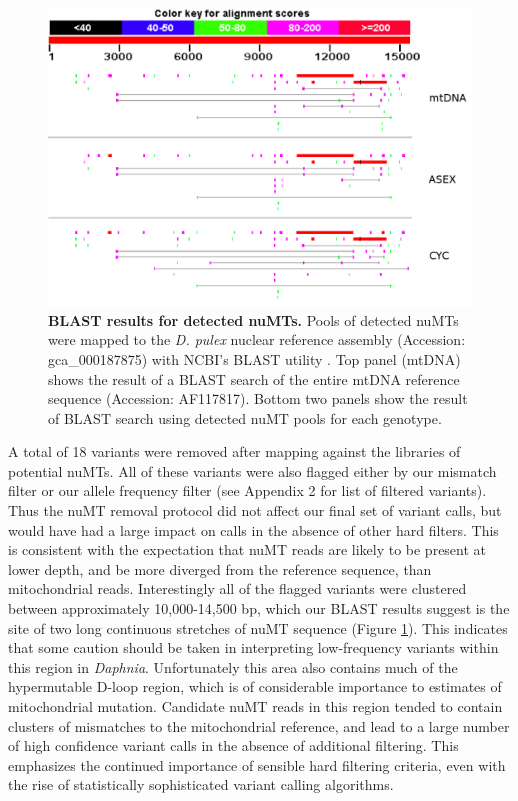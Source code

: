 \documentclass[12pt,twoside]{reedthesis}
\begin{document}
\begin{figure}[h]
    \begin{center}
        \includegraphics[width=1\linewidth]{../figures/numt_blast.jpeg}
    \end{center}
    \caption[BLAST results for detected nuMTs]{\textbf{BLAST results for detected nuMTs.} Pools of detected nuMTs were mapped to the \textit{D. pulex} nuclear reference assembly (Accession: gca\_000187875) with NCBI's BLAST utility \citep{altschul_basic_1990}. Top panel (mtDNA) shows the result of a BLAST search of the entire mtDNA reference sequence (Accession: AF117817). Bottom two panels show the result of BLAST search using detected nuMT pools for each genotype.}
    \label{numt}
\end{figure}

A total of 18 variants were removed after mapping against the libraries of potential nuMTs.
All of these variants were also flagged either by our mismatch filter or our allele frequency filter (see Appendix 2 for list of filtered variants). 
Thus the nuMT removal protocol did not affect our final set of variant calls, but would have had a large impact on calls in the absence of other hard filters. 
This is consistent with the expectation that nuMT reads are likely to be present at lower depth, and be more diverged from the reference sequence, than mitochondrial reads.
Interestingly all of the flagged variants were clustered between approximately 10,000-14,500 bp, which our BLAST results suggest is the site of two long continuous stretches of nuMT sequence (Figure \ref{numt}).
This indicates that some caution should be taken in interpreting low-frequency variants within this region in \textit{Daphnia}.  
Unfortunately this area also contains much of the hypermutable D-loop region, which is of considerable importance to estimates of mitochondrial mutation.
Candidate nuMT reads in this region tended to contain clusters of mismatches to the mitochondrial reference, and lead to a large number of high confidence variant calls in the absence of additional filtering. 
This emphasizes the continued importance of sensible hard filtering criteria, even with the rise of statistically sophisticated variant calling algorithms.
\end{document}
